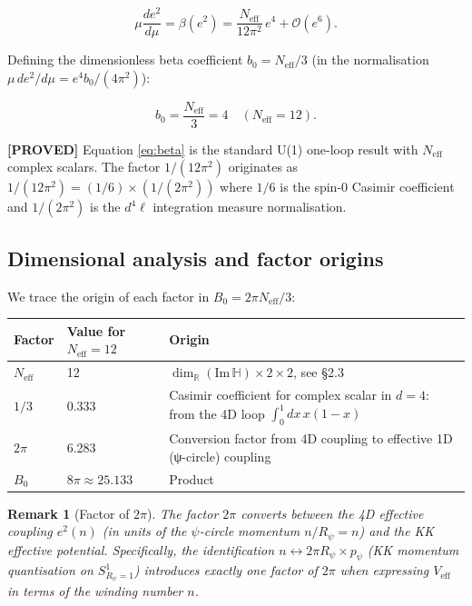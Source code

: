 \documentclass[11pt,a4paper]{article}
\newtheorem{remark}{Remark}
\newcommand{\proved}[1]{\textbf{[PROVED]} #1}
\begin{document}
\begin{equation}
  \label{eq:beta}
  \mu\frac{de^2}{d\mu}
  = \beta(e^2)
  = \frac{N_\mathrm{eff}}{12\pi^2}\,e^4 + \mathcal{O}(e^6).
\end{equation}

Defining the dimensionless beta coefficient $b_0 = N_\mathrm{eff}/3$ (in the
normalisation $\mu\,de^2/d\mu = e^4 b_0/(4\pi^2)$):

\begin{equation}
  \label{eq:b0}
  \boxed{b_0 = \frac{N_\mathrm{eff}}{3} = 4 \quad (N_\mathrm{eff} = 12).}
\end{equation}

\proved{Equation \eqref{eq:beta} is the standard U(1) one-loop result with $N_\mathrm{eff}$
complex scalars.  The factor $1/(12\pi^2)$ originates as
$1/(12\pi^2) = (1/6) \times (1/(2\pi^2))$ where $1/6$ is the spin-0 Casimir
coefficient and $1/(2\pi^2)$ is the $d^4\ell$ integration measure normalisation.}

\subsection{Dimensional analysis and factor origins}

We trace the origin of each factor in $B_0 = 2\pi N_\mathrm{eff}/3$:

\begin{center}
\begin{tabular}{lll}
\hline
Factor & Value for $N_\mathrm{eff}=12$ & Origin \\\hline
$N_\mathrm{eff}$ & 12 & $\dim_\mathbb{R}(\mathrm{Im}\,\mathbb{H}) \times 2 \times 2$, see \S 2.3 \\
$1/3$ & 0.333 & Casimir coefficient for complex scalar in $d=4$: from the 4D loop $\int_0^1 dx\,x(1-x)$ \\
$2\pi$ & 6.283 & Conversion factor from 4D coupling to effective 1D (ψ-circle) coupling \\
$B_0$ & $8\pi \approx 25.133$ & Product \\\hline
\end{tabular}
\end{center}

\begin{remark}[Factor of $2\pi$]
The factor $2\pi$ converts between the 4D effective coupling $e^2(n)$ (in units of
the $\psi$-circle momentum $n/R_\psi = n$) and the KK effective potential.
Specifically, the identification $n \leftrightarrow 2\pi R_\psi \times p_\psi$
(KK momentum quantisation on $S^1_{R_\psi=1}$) introduces exactly one factor of
$2\pi$ when expressing $V_\mathrm{eff}$ in terms of the winding number $n$.
\end{remark}
\end{document}
